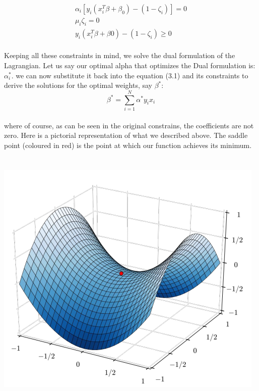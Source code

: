 \documentclass[twoside]{article}
\begin{document}
\begin{align*} 
\alpha_{i}[y_{i}(x_{i}^{T}\beta + \beta_{0}) - (1 - \zeta_{i})] = 0\\
\mu_{i}\zeta_{i} = 0\\
y_{i}(x_{i}^{T}\beta + \beta{0}) - (1 - \zeta_{i}) \geq 0
\end{align*}
\\
Keeping all these constraints in mind, we solve the dual formulation of the Lagrangian. Let us say our optimal alpha that optimizes the Dual formulation is: $\alpha_{i}^{*}$. we can now substitute it back into the equation (3.1) and its constraints to derive the solutions for the optimal weights, say $\beta^{*}$:\\
\begin{equation}
    \beta^{*} = \sum_{i=1}^{N}\alpha^{*}y_{i}x_{i}
\end{equation}
\\

where of course, as can be seen in the original constrains, the coefficients are not zero.
Here is a pictorial representation of what we described above. The saddle point (coloured in red) is the point at which our function achieves its minimum.\\
\\
\paragraph{}
\includegraphics[scale=0.8]{optimizationPic.PNG}
\end{document}
